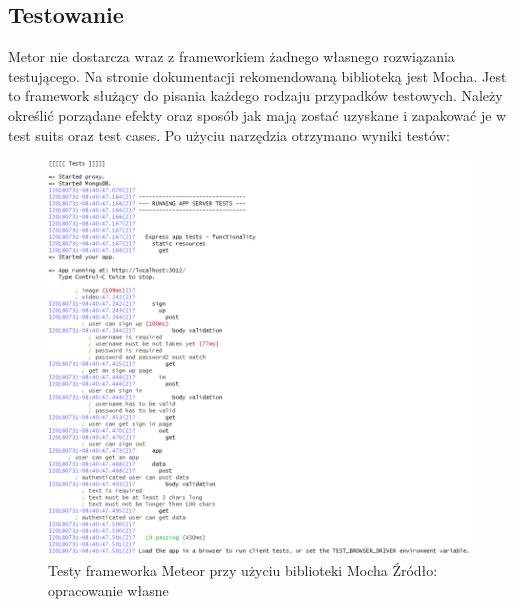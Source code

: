 \documentclass[12pt]{report}
\begin{document}
    \subsection{Testowanie}
      Metor nie dostarcza wraz z frameworkiem żadnego własnego rozwiązania testującego.
      Na stronie dokumentacji rekomendowaną biblioteką jest Mocha.
      Jest to framework służący do pisania każdego rodzaju przypadków testowych.
      Należy określić porządane efekty oraz sposób jak mają zostać uzyskane i zapakować je w test suits oraz test cases.
      Po użyciu narzędzia otrzymano wyniki testów:
      \begin{figure}[!hb]
        \centering
        \includegraphics[width=\textwidth,height=\textheight,keepaspectratio]{test_meteor.png} 
        \caption{Testy frameworka Meteor przy użyciu biblioteki Mocha \newline Źródło: opracowanie własne}
      \end{figure}
\end{document}
